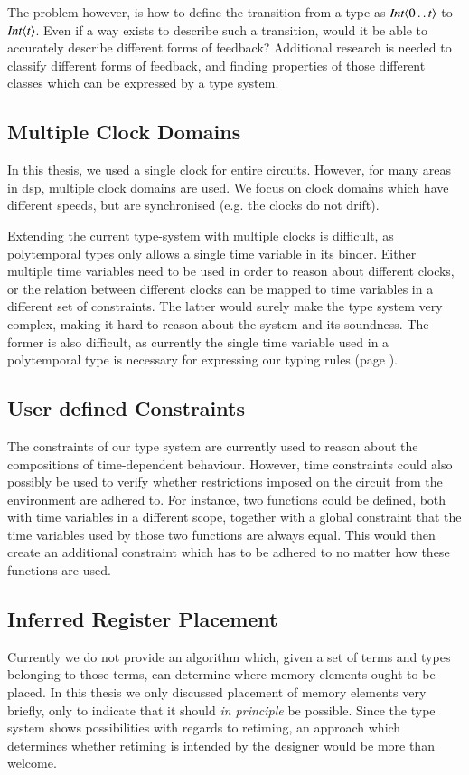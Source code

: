 The problem however, is how to define the transition from a type as \ensuremath{\Conid{Int}\langle\mathrm{0}\mathinner{\ldotp\ldotp}\Varid{t}\rangle} to \ensuremath{\Conid{Int}\langle\Varid{t}\rangle}.
Even if a way exists to describe such a transition, would it be able to accurately describe different forms of feedback?
Additional research is needed to classify different forms of feedback, and finding properties of those different classes which can be expressed by a type system.

\subsection{Multiple Clock Domains}
In this thesis, we used a single clock for entire circuits.
However, for many areas in \gls{dsp}, multiple clock domains are used.
We focus on clock domains which have different speeds, but are synchronised (e.g. the clocks do not drift).

Extending the current type-system with multiple clocks is difficult, as polytemporal types only allows a single time variable in its binder.
Either multiple time variables need to be used in order to reason about different clocks, or the relation between different clocks can be mapped to time variables in a different set of constraints.
The latter would surely make the type system very complex, making it hard to reason about the system and its soundness.
The former is also difficult, as currently the single time variable used in a polytemporal type is necessary for expressing our typing rules (page \pageref{def:typerules}).

\subsection{User defined Constraints} \label{sec:usrcon}
The constraints of our type system are currently used to reason about the compositions of time-dependent behaviour.
However, time constraints could also possibly be used to verify whether restrictions imposed on the circuit from the environment are adhered to.
For instance, two functions could be defined, both with time variables in a different scope, together with a global constraint that the time variables used by those two functions are always equal.
This would then create an additional constraint which has to be adhered to no matter how these functions are used.

\subsection{Inferred Register Placement}
Currently we do not provide an algorithm which, given a set of terms and types belonging to those terms, can determine where memory elements ought to be placed.
In this thesis we only discussed placement of memory elements very briefly, only to indicate that it should \textit{in principle} be possible.
Since the type system shows possibilities with regards to retiming, an approach which determines whether retiming is intended by the designer would be more than welcome.

